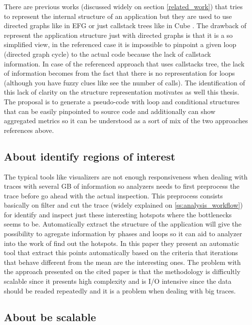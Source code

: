 There are previous works (discussed widely on section \ref{related_work})  that 
tries to represent the internal structure of an application but they are used to
use directed graphs like in EFG \cite{aguilar2016event} or just callstack trees like
in Cube \cite{saviankou2015cube}. The drawback of represent the application structure
just with directed graphs is that it is a so simplified view, in the referenced
case it is impossible to pinpoint a given loop (directed graph cycle) to the
actual code because the lack of callstack information. In case of the
referenced approach that uses callstacks tree, the lack of information becomes
from the fact that there is no representation for loops (although you have fuzzy
clues like see the number of calls). The identification of this lack of clarity
on the structure representation motivates as well this thesis. The proposal is to 
generate a pseudo-code with loop and conditional structures that can be easily 
pinpointed to source code and additionally can show aggregated metrics so it can 
be understood as a sort of mix of the two approaches references above.

\subsection{About identify regions of
interest}\label{ss:mot_regions_of_interest}

The typical tools like visualizers are not enough responsiveness when dealing
with traces with several GB of information so analyzers needs to first
preprocess the trace before go ahead with the actual inspection. This preprocess
consists basically on filter and cut the trace (widely explained on
\ref{ss:analysis_workflow}) for identify and inspect just these interesting 
hotspots where the bottlenecks seems to be. Automatically extract the structure
of the application will give the possibility to agregate information by phases
and loops so it can aid to analyzer into the work of find out the
hotspots. In this paper \cite{trahay2015selecting} they present an automatic
tool that extract this points automatically based on the criteria that
iterations that behave different from the mean are the interesting ones. The
problem with the approach presented on the cited paper is that the methodology
is difficultly scalable since it presents high complexity and is I/O
intensive since the data should be readed repeatedly and it is a problem
when dealing with big traces. 

\subsection{About be scalable}


